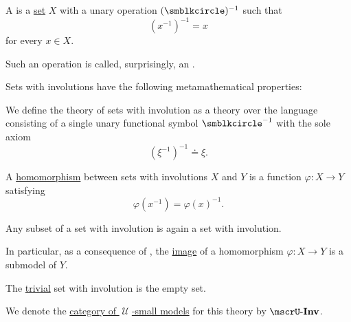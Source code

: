\begin{definition}\label{def:set_with_involution}\mimprovised
  A  is a \hyperref[def:set]{set} \( X \) with a unary operation \( (\anon)^{-1} \) such that
  \begin{equation*}
    (x^{-1})^{-1} = x
  \end{equation*}
  for every \( x \in X \).

  Such an operation is called, surprisingly, an .

  Sets with involutions have the following metamathematical properties:
  \begin{thmenum}
     We define the theory of sets with involution as a theory over the language consisting of a single unary functional symbol \( \anon^{-1} \) with the sole axiom
    \begin{equation}\label{eq:def:set_with_involution/theory/axiom}
      (\xi^{-1})^{-1} \doteq \xi.
    \end{equation}

     A \hyperref[def:first_order_homomorphism]{homomorphism} between sets with involutions \( X \) and \( Y \) is a function \( \varphi: X \to Y \) satisfying
    \begin{equation}\label{eq:def:set_with_involution/homomorphism}
      \varphi(x^{-1})
      =
      \varphi(x)^{-1}.
    \end{equation}

     Any subset of a set with involution is again a set with involution.

    In particular, as a consequence of , the \hyperref[def:multi_valued_function/image]{image} of a homomorphism \( \varphi: X \to Y \) is a submodel of \( Y \).

     The \hyperref[thm:substructures_form_complete_lattice/bottom]{trivial} set with involution is the empty set.

     We denote the \hyperref[def:category_of_small_first_order_models]{category of \( \mscrU \)-small models} for this theory by \( \ucat{Inv} \).
  \end{thmenum}
\end{definition}

